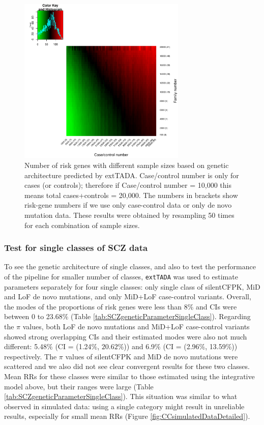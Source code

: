 \documentclass[]{article}
\begin{document}
\begin{figure}[h]
\includegraphics[width=\textwidth,height=8cm]{Picture//heatmap_countgene_powerFDR005.pdf}
\caption{Number of risk genes with different sample sizes based on
  genetic architecture predicted by extTADA. Case/control number is
  only for cases (or controls); therefore if Case/control number =
  10,000 this means total cases+controls = 20,000. The numbers in brackets show risk-gene numbers if we use only case-control data or only de novo mutation data. These results were obtained by resampling 50 times for each combination of sample sizes.}
\label{fig:heatmapcountgenepower}
\end{figure}

\subsubsection{Test for single classes of SCZ data}

To see the genetic architecture of single classes, and also to test the performance of the pipeline for smaller
number of classes, \texttt{extTADA} was used to estimate parameters separately for four
single classes: only single class of silentCFPK, MiD and LoF de novo
mutations, and only MiD+LoF case-control variants. Overall, the modes of the proportions of risk genes were
less than 8$\%$ and CIs were between 0 to 23.68$\%$ (Table
\ref{tab:SCZgeneticParameterSingleClass}). Regarding the $\pi$ values,
both LoF de novo mutations and MiD+LoF case-control variants showed strong overlapping CIs and
their estimated modes were also not much different: 5.48$\%$ (CI =
(1.24$\%$, $20.62\%$)) and 6.9$\%$ (CI = (2.96$\%$, 13.59$\%$))
respectively. The $\pi$ values of silentCFPK and MiD de novo mutations
were scattered and we also did not see clear convergent results for these
two classes. Mean RRs for these classes were similar to those
estimated using the integrative model above, but their ranges were
large (Table \ref{tab:SCZgeneticParameterSingleClass}). This situation
was similar to what observed in simulated data: using a single category
might result in unreliable results, especially for small mean RRs
(Figure \ref{fig:CCsimulatedDataDetailed}).
\end{document}
